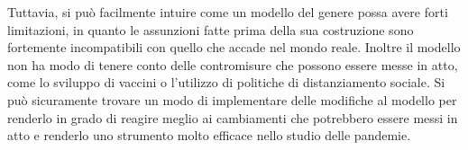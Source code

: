 \documentclass[a4paper,12pt]{article}
\theoremstyle{break}
\numberwithin{equation}{section}
\begin{document}
Tuttavia, si può facilmente intuire come un modello del genere possa avere forti limitazioni, in quanto le assunzioni fatte prima della sua costruzione sono fortemente incompatibili con quello che accade nel mondo reale. Inoltre il modello non ha modo di tenere conto delle contromisure che possono essere messe in atto, come lo sviluppo di vaccini o l'utilizzo di politiche di distanziamento sociale. Si può sicuramente trovare un modo di implementare delle modifiche al modello per renderlo in grado di reagire meglio ai cambiamenti che potrebbero essere messi in atto e renderlo uno strumento molto efficace nello studio delle pandemie.
\end{document}

